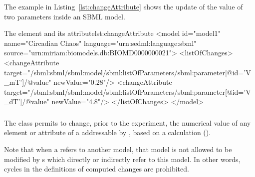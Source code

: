 The example in Listing~\ref{lst:changeAttribute} shows the update of the value of two parameters inside an SBML model.

\begin{myXmlLst}{The  element and its  attribute}{lst:changeAttribute}
<model id="model1" name="Circadian Chaos" language="urn:sedml:language:sbml" 
	source="urn:miriam:biomodels.db:BIOMD0000000021">
	<listOfChanges>
		<changeAttribute target="/sbml:sbml/sbml:model/sbml:listOfParameters/sbml:parameter[@id='V_mT']/@value" newValue="0.28"/>
  		<changeAttribute target="/sbml:sbml/sbml:model/sbml:listOfParameters/sbml:parameter[@id='V_dT']/@value" newValue="4.8"/>
	</listOfChanges>
</model>
\end{myXmlLst}


\subsubsection{}
\label{class:computeChange}
The  class permits to change, prior to the experiment, the numerical value of any element or attribute of a \Model addressable by , based on a calculation ().  


Note that when a  refers to another model, that model is not allowed to be modified by s which directly or indirectly refer to this model. In other words, cycles in the definitions of computed changes are prohibited.  

